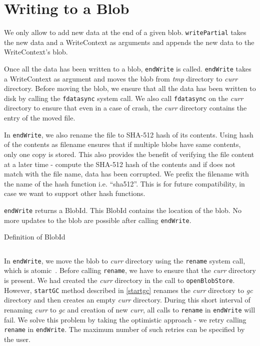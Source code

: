 \section{Writing to a Blob}
We only allow to add new data at the end of a given blob. \texttt{writePartial} takes the new data and a WriteContext as arguments and appends the new data to the WriteContext's blob.

Once all the data has been written to a blob, \texttt{endWrite} is called. \texttt{endWrite} takes a WriteContext as argument and moves the blob from \textit{tmp} directory to \textit{curr} directory. Before moving the blob, we ensure that all the data has been written to disk by calling the \texttt{fdatasync} system call.
We also call \texttt{fdatasync} on the \textit{curr} directory to ensure that even in a case of crash, the \textit{curr} directory contains the entry of the moved file.

In \texttt{endWrite}, we also rename the file to SHA-512 hash of its contents. Using hash of the contents as filename ensures that if multiple blobs have same contents, only one copy is stored. This also provides the benefit of verifying the file content at a later time - compute the SHA-512 hash of the contents and if does not match with the file name, data has been corrupted.
We prefix the filename with the name of the hash function i.e. ``sha512''. This is for future compatibility, in case we want to support other hash functions.

\texttt{endWrite} returns a BlobId. This BlobId contains the location of the blob. No more updates to the blob are possible after calling \texttt{endWrite}.

\begin{program}
  \caption{Definition of BlobId}
  \label{prog:defblobid}
  \inputminted{haskell}{hs/blobid.hs}
\end{program}

In \texttt{endWrite}, we move the blob to \textit{curr} directory using the \texttt{rename} system call, which is atomic~\cite{renamemanpage}. Before calling \texttt{rename}, we have to ensure that the \textit{curr} directory is present. We had created the \textit{curr} directory in the call to \texttt{openBlobStore}.
However, \texttt{startGC} method described in \ref{startgc} renames the \textit{curr} directory to \textit{gc} directory and then creates an empty \textit{curr} directory. During this short interval of renaming \textit{curr} to \textit{gc} and creation of new \textit{curr}, all calls to \texttt{rename} in \texttt{endWrite} will fail.
We solve this problem by taking the optimistic approach - we retry calling \texttt{rename} in \texttt{endWrite}. The maximum number of such retries can be specified by the user.


